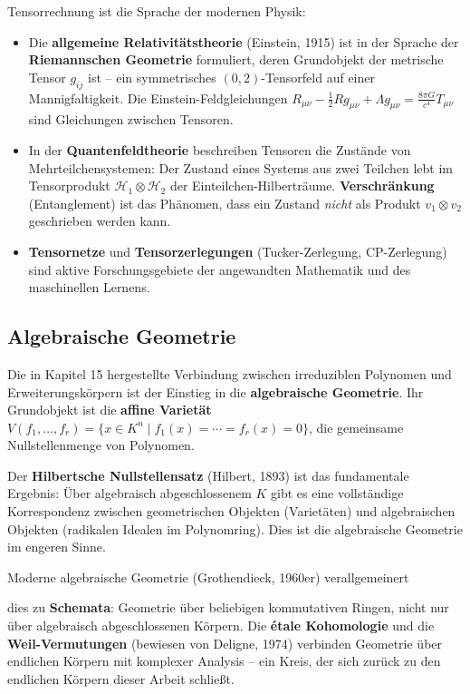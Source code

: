 ﻿\documentclass[a4paper,12pt]{report}
\theoremstyle{definition}
\begin{document}
Tensorrechnung ist die Sprache der modernen Physik:
\begin{itemize}
    \item[-] Die \textbf{allgemeine Relativitätstheorie} (Einstein, 1915)
          ist in der Sprache der \textbf{Riemannschen Geometrie}
          formuliert, deren Grundobjekt der metrische Tensor $g_{ij}$
          ist -- ein symmetrisches $(0,2)$-Tensorfeld auf einer
          Mannigfaltigkeit. Die Einstein-Feldgleichungen
          $R_{\mu\nu} - \frac{1}{2}Rg_{\mu\nu} + \Lambda g_{\mu\nu}
          = \frac{8\pi G}{c^4} T_{\mu\nu}$ sind Gleichungen zwischen
          Tensoren.
    \item[-] In der \textbf{Quantenfeldtheorie} beschreiben
          Tensoren die Zustände von Mehrteilchensystemen: Der
          Zustand eines Systems aus zwei Teilchen lebt im
          Tensorprodukt $\mathcal{H}_1 \otimes \mathcal{H}_2$
          der Einteilchen-Hilberträume. \textbf{Verschränkung}
          (Entanglement) ist das Phänomen, dass ein Zustand
          \emph{nicht} als Produkt $v_1 \otimes v_2$ geschrieben
          werden kann.
    \item[-] \textbf{Tensornetze} und \textbf{Tensorzerlegungen}
          (Tucker-Zerlegung, CP-Zerlegung) sind aktive
          Forschungsgebiete der angewandten Mathematik und des
          maschinellen Lernens.
\end{itemize}

\subsection*{Algebraische Geometrie}

Die in Kapitel 15 hergestellte Verbindung zwischen irreduziblen
Polynomen und Erweiterungskörpern ist der Einstieg in die
\textbf{algebraische Geometrie}. Ihr Grundobjekt ist die
\textbf{affine Varietät}
$V(f_1, \ldots, f_r) = \{x \in K^n \mid f_1(x) = \cdots = f_r(x) = 0\}$,
die gemeinsame Nullstellenmenge von Polynomen.

Der \textbf{Hilbertsche Nullstellensatz} (Hilbert, 1893) ist das
fundamentale Ergebnis: Über algebraisch abgeschlossenem $K$ gibt es
eine vollständige Korrespondenz zwischen geometrischen Objekten
(Varietäten) und algebraischen Objekten (radikalen Idealen im
Polynomring). Dies ist die algebraische Geometrie im engeren Sinne.

Moderne algebraische Geometrie (Grothen\-dieck, 1960er) verall\-gemeinert

dies zu \textbf{Schemata}: Geometrie über beliebigen kommutativen
Ringen, nicht nur über algebraisch abgeschlossenen Körpern.
Die \textbf{étale Kohomologie} und die \textbf{Weil-Ver\-mutungen}
(bewiesen von Deligne, 1974) verbinden Geometrie über endlichen
Körpern mit komplexer Analysis -- ein Kreis, der sich zurück zu den
endlichen Körpern dieser Arbeit schließt.
\end{document}

